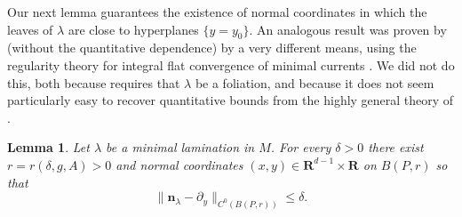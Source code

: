\documentclass[reqno,11pt]{amsart}
\newcommand{\RR}{\mathbf{R}}
\newcommand{\normal}{\mathbf n}
\newtheorem{lemma}[theorem]{Lemma}
\theoremstyle{definition}
\numberwithin{equation}{section}
\begin{document}
Our next lemma guarantees the existence of normal coordinates in which the leaves of $\lambda$ are close to hyperplanes $\{y = y_0\}$.
An analogous result was proven by \cite{Solomon86} (without the quantitative dependence) by a very different means, using the regularity theory for integral flat convergence of minimal currents \cite[Theorem 5.3.14]{federer2014geometric}.
We did not do this, both because \cite{Solomon86} requires that $\lambda$ be a foliation, and because it does not seem particularly easy to recover quantitative bounds from the highly general theory of \cite[Chapter 5]{federer2014geometric}.

\begin{lemma}\label{lams have C0 fields}
	Let $\lambda$ be a minimal lamination in $M$.
	For every $\delta > 0$ there exist $r = r(\delta, g, A) > 0$ and normal coordinates $(x, y) \in \RR^{d - 1} \times \RR$ on $B(P, r)$ so that
\begin{equation}\label{normal is basically dy}
	\|\normal_\lambda - \partial_y\|_{C^0(B(P, r))} \leq \delta.
\end{equation}
\end{lemma}
\end{document}
